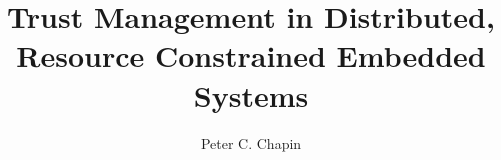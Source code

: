 \documentclass[11pt]{report}
\newcommand{\primaryspacing}{\doublespace}
\begin{document}
\title{Trust Management in Distributed,\\Resource Constrained Embedded Systems}
\author{Peter C. Chapin}
\maketitle

\makeacceptance
{}





\singlespace

\tableofcontents
\clearpage

\listoftables
\clearpage

\listoffigures
\clearpage

%

\primaryspacing
{}









\appendix

%






\primaryspacing

%
\end{document}
